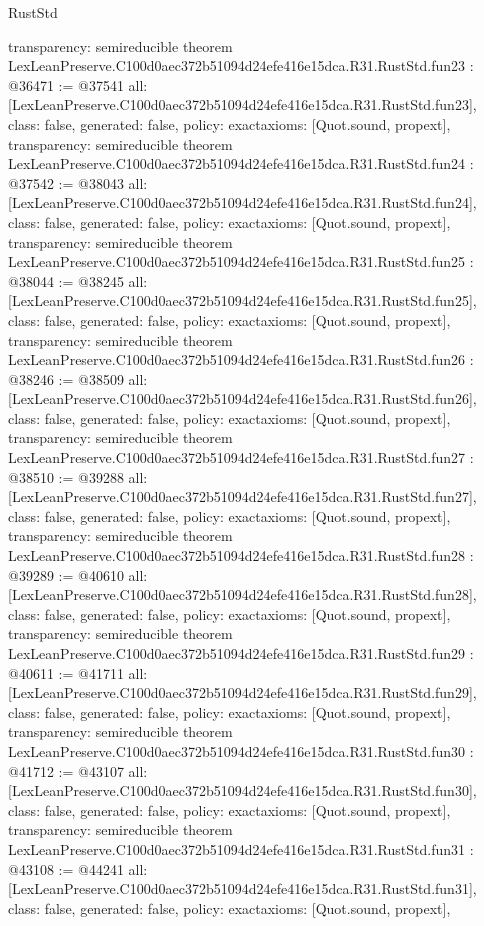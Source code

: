 \begin{lexlean}{RustStd}
\begin{coremodule}
{  transparency: semireducible
}
theorem LexLeanPreserve.C100d0aec372b51094d24efe416e15dca.R31.RustStd.fun23 : @36471 := @37541 {
  all: [LexLeanPreserve.C100d0aec372b51094d24efe416e15dca.R31.RustStd.fun23],
  class: false,
  generated: false,
  policy: exact{axioms: [Quot.sound, propext]},
  transparency: semireducible
}
theorem LexLeanPreserve.C100d0aec372b51094d24efe416e15dca.R31.RustStd.fun24 : @37542 := @38043 {
  all: [LexLeanPreserve.C100d0aec372b51094d24efe416e15dca.R31.RustStd.fun24],
  class: false,
  generated: false,
  policy: exact{axioms: [Quot.sound, propext]},
  transparency: semireducible
}
theorem LexLeanPreserve.C100d0aec372b51094d24efe416e15dca.R31.RustStd.fun25 : @38044 := @38245 {
  all: [LexLeanPreserve.C100d0aec372b51094d24efe416e15dca.R31.RustStd.fun25],
  class: false,
  generated: false,
  policy: exact{axioms: [Quot.sound, propext]},
  transparency: semireducible
}
theorem LexLeanPreserve.C100d0aec372b51094d24efe416e15dca.R31.RustStd.fun26 : @38246 := @38509 {
  all: [LexLeanPreserve.C100d0aec372b51094d24efe416e15dca.R31.RustStd.fun26],
  class: false,
  generated: false,
  policy: exact{axioms: [Quot.sound, propext]},
  transparency: semireducible
}
theorem LexLeanPreserve.C100d0aec372b51094d24efe416e15dca.R31.RustStd.fun27 : @38510 := @39288 {
  all: [LexLeanPreserve.C100d0aec372b51094d24efe416e15dca.R31.RustStd.fun27],
  class: false,
  generated: false,
  policy: exact{axioms: [Quot.sound, propext]},
  transparency: semireducible
}
theorem LexLeanPreserve.C100d0aec372b51094d24efe416e15dca.R31.RustStd.fun28 : @39289 := @40610 {
  all: [LexLeanPreserve.C100d0aec372b51094d24efe416e15dca.R31.RustStd.fun28],
  class: false,
  generated: false,
  policy: exact{axioms: [Quot.sound, propext]},
  transparency: semireducible
}
theorem LexLeanPreserve.C100d0aec372b51094d24efe416e15dca.R31.RustStd.fun29 : @40611 := @41711 {
  all: [LexLeanPreserve.C100d0aec372b51094d24efe416e15dca.R31.RustStd.fun29],
  class: false,
  generated: false,
  policy: exact{axioms: [Quot.sound, propext]},
  transparency: semireducible
}
theorem LexLeanPreserve.C100d0aec372b51094d24efe416e15dca.R31.RustStd.fun30 : @41712 := @43107 {
  all: [LexLeanPreserve.C100d0aec372b51094d24efe416e15dca.R31.RustStd.fun30],
  class: false,
  generated: false,
  policy: exact{axioms: [Quot.sound, propext]},
  transparency: semireducible
}
theorem LexLeanPreserve.C100d0aec372b51094d24efe416e15dca.R31.RustStd.fun31 : @43108 := @44241 {
  all: [LexLeanPreserve.C100d0aec372b51094d24efe416e15dca.R31.RustStd.fun31],
  class: false,
  generated: false,
  policy: exact{axioms: [Quot.sound, propext]},
}
\end{coremodule}
\end{lexlean}
